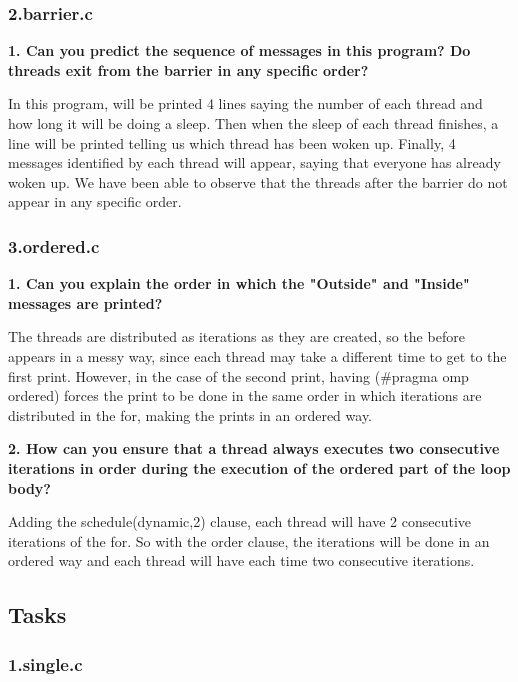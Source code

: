 \documentclass[12pt, a4paper]{article}
\begin{document}
\subsubsection{2.barrier.c}

\textbf{1. Can you predict the sequence of messages in this program? Do threads exit from the barrier
in any specific order?}

\hfill

In this program, will be printed 4 lines saying the number of each thread and how long it will be doing a sleep.
Then when the sleep of each thread finishes, a line will be printed telling us which thread has been woken up.
Finally, 4 messages identified by each thread will appear, saying that everyone has already woken up.
We have been able to observe that the threads after the barrier do not appear in any specific order.

\subsubsection{3.ordered.c}

\textbf{1. Can you explain the order in which the "Outside" and "Inside" messages are printed?}

\hfill

The threads are distributed as iterations as they are created, so the before appears in a messy way, since each thread may take a different time to get to the first print.
However, in the case of the second print, having (\#pragma omp ordered) forces the print to be done in the same order in which iterations are distributed in the for, making the prints in an ordered way.

\hfill

\textbf{2. How can you ensure that a thread always executes two consecutive iterations in order during
the execution of the ordered part of the loop body?}

\hfill

Adding the schedule(dynamic,2) clause, each thread will have 2 consecutive iterations of the for.
So with the order clause, the iterations will be done in an ordered way and each thread will have each time two consecutive iterations.

\subsection{Tasks}

\subsubsection{1.single.c}
\end{document}
